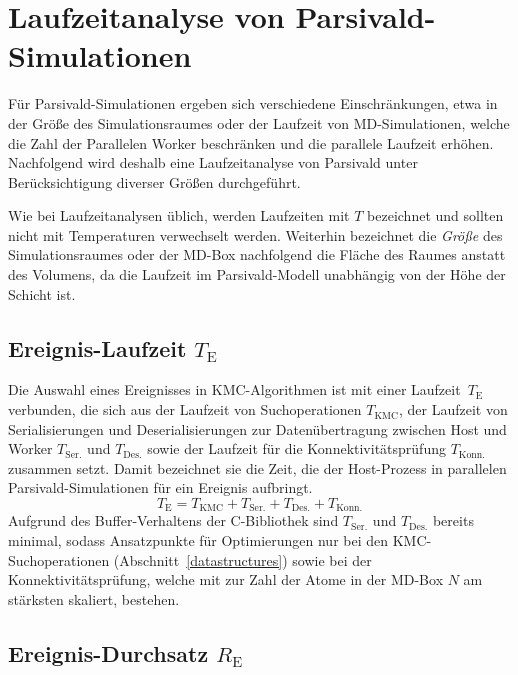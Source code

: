 \section{Laufzeitanalyse von Parsivald-Simulationen}
\label{runtime}

Für Parsivald-Simulationen ergeben sich verschiedene Einschränkungen, etwa in der Größe des Simulationsraumes oder der Laufzeit von MD-Simulationen, welche die Zahl der Parallelen Worker beschränken und die parallele Laufzeit erhöhen.
Nachfolgend wird deshalb eine Laufzeitanalyse von Parsivald unter Berücksichtigung diverser Größen durchgeführt.

Wie bei Laufzeitanalysen üblich, werden Laufzeiten mit $T$ bezeichnet und sollten nicht mit Temperaturen verwechselt werden.
Weiterhin bezeichnet die \textit{Größe} des Simulationsraumes oder der MD-Box nachfolgend die Fläche des Raumes anstatt des Volumens, da die Laufzeit im Parsivald-Modell unabhängig von der Höhe der Schicht ist.

\subsection{Ereignis-Laufzeit \texorpdfstring{$T_\text{E}$}{TE}}

Die Auswahl eines Ereignisses in KMC-Algorithmen ist mit einer Laufzeit~$T_\text{E}$ verbunden, die sich aus der Laufzeit von Suchoperationen $T_\text{KMC}$, der Laufzeit von Serialisierungen und Deserialisierungen zur Datenübertragung zwischen Host und Worker $T_\text{Ser.}$ und $T_\text{Des.}$ sowie der Laufzeit für die Konnektivitätsprüfung $T_\text{Konn.}$ zusammen setzt.
Damit bezeichnet sie die Zeit, die der Host-Prozess in parallelen Parsivald-Simulationen für ein Ereignis aufbringt.
\begin{equation}
T_\text{E} = T_\text{KMC} + T_\text{Ser.} + T_\text{Des.} + T_\text{Konn.}
\end{equation}
Aufgrund des Buffer-Verhaltens der C-Bibliothek sind $T_\text{Ser.}$ und $T_\text{Des.}$ bereits minimal, sodass Ansatzpunkte für Optimierungen nur bei den KMC-Suchoperationen (Abschnitt~\ref{datastructures}) sowie bei der Konnektivitätsprüfung, welche mit  zur Zahl der Atome in der MD-Box $N$ am stärksten skaliert, bestehen.

\subsection{Ereignis-Durchsatz \texorpdfstring{$R_\text{E}$}{RE}}

